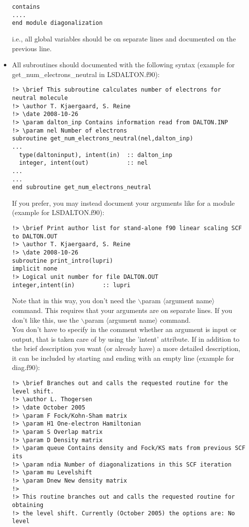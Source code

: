\documentclass[preprint,aps]{revtex4}
\begin{document}
\begin{itemize}
\begin{verbatim}
contains
....
end module diagonalization
\end{verbatim}
i.e., all global variables should be on separate lines and documented on the previous line. 
\item All subroutines should documented with the following syntax (example for get\_num\_electrons\_neutral in LSDALTON.f90):
\begin{verbatim}
!> \brief This subroutine calculates number of electrons for neutral molecule
!> \author T. Kjaergaard, S. Reine
!> \date 2008-10-26
!> \param dalton_inp Contains information read from DALTON.INP 
!> \param nel Number of electrons
subroutine get_num_electrons_neutral(nel,dalton_inp)
...
  type(daltoninput), intent(in)  :: dalton_inp
  integer, intent(out)           :: nel
...
...
end subroutine get_num_electrons_neutral
\end{verbatim}
If you prefer, you may instead document your arguments like for a module (example for LSDALTON.f90):
\begin{verbatim}
!> \brief Print author list for stand-alone f90 linear scaling SCF to DALTON.OUT
!> \author T. Kjaergaard, S. Reine
!> \date 2008-10-26
subroutine print_intro(lupri)
implicit none
!> Logical unit number for file DALTON.OUT
integer,intent(in)        :: lupri
\end{verbatim}
Note that in this way, you don't need the ${\backslash}$param $\langle$argument name$\rangle$ command. This requires that your arguments 
are on separate lines. If you don't like this, use the ${\backslash}$param $\langle$argument name$\rangle$ command. \\ 
You don't have to specify in the comment whether an argument is input or output, that is taken care of by using the 'intent'
attribute. If in addition to the brief description you want (or already have) a more detailed description, it can be included by starting and
ending with an empty line (example for diag.f90):
\begin{verbatim}
!> \brief Branches out and calls the requested routine for the level shift.
!> \author L. Thogersen
!> \date October 2005
!> \param F Fock/Kohn-Sham matrix
!> \param H1 One-electron Hamiltonian
!> \param S Overlap matrix
!> \param D Density matrix
!> \param queue Contains density and Fock/KS mats from previous SCF its
!> \param ndia Number of diagonalizations in this SCF iteration
!> \param mu Levelshift
!> \param Dnew New density matrix
!>
!> This routine branches out and calls the requested routine for obtaining 
!> the level shift. Currently (October 2005) the options are: No level 

\end{verbatim}
\end{itemize}
\end{document}
